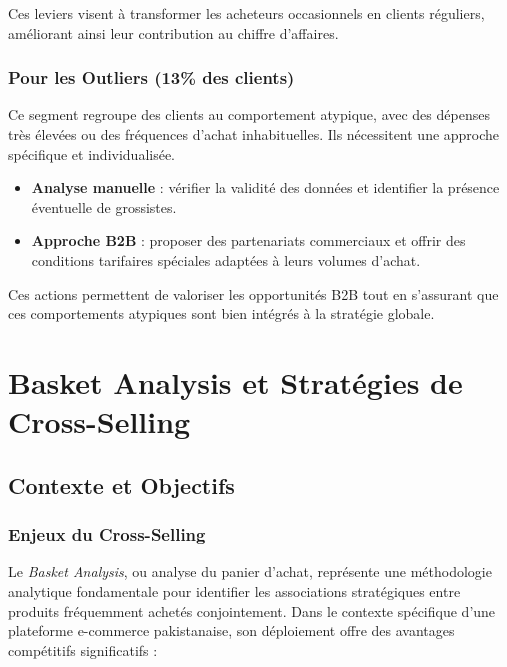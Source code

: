 \documentclass[a4paper,12pt]{article}
\begin{document}
Ces leviers visent à transformer les acheteurs occasionnels en clients réguliers, améliorant ainsi leur contribution au chiffre d'affaires.

\subsection{Pour les Outliers (13\% des clients)}

Ce segment regroupe des clients au comportement atypique, avec des dépenses très élevées ou des fréquences d'achat inhabituelles. Ils nécessitent une approche spécifique et individualisée.

\begin{itemize}
    \item \textbf{Analyse manuelle} : vérifier la validité des données et identifier la présence éventuelle de grossistes.
    \item \textbf{Approche B2B} : proposer des partenariats commerciaux et offrir des conditions tarifaires spéciales adaptées à leurs volumes d'achat.
\end{itemize}

Ces actions permettent de valoriser les opportunités B2B tout en s'assurant que ces comportements atypiques sont bien intégrés à la stratégie globale.

\chapter{Basket Analysis et Stratégies de Cross-Selling}

\section{Contexte et Objectifs}

\subsection{Enjeux du Cross-Selling}

Le \textit{Basket Analysis}, ou analyse du panier d'achat, représente une méthodologie analytique fondamentale pour identifier les associations stratégiques entre produits fréquemment achetés conjointement. Dans le contexte spécifique d'une plateforme e-commerce pakistanaise, son déploiement offre des avantages compétitifs significatifs :
\end{document}
